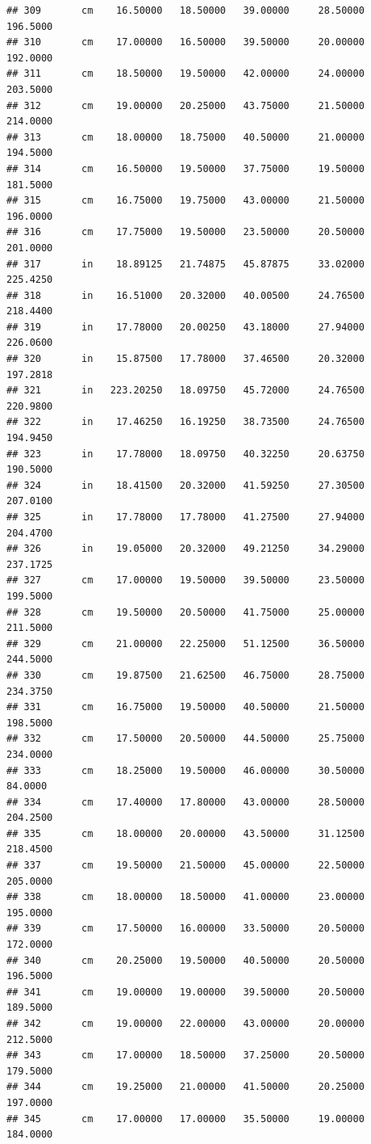 \documentclass[]{article}
\begin{document}
\begin{verbatim}
## 309       cm    16.50000   18.50000   39.00000     28.50000  196.5000
## 310       cm    17.00000   16.50000   39.50000     20.00000  192.0000
## 311       cm    18.50000   19.50000   42.00000     24.00000  203.5000
## 312       cm    19.00000   20.25000   43.75000     21.50000  214.0000
## 313       cm    18.00000   18.75000   40.50000     21.00000  194.5000
## 314       cm    16.50000   19.50000   37.75000     19.50000  181.5000
## 315       cm    16.75000   19.75000   43.00000     21.50000  196.0000
## 316       cm    17.75000   19.50000   23.50000     20.50000  201.0000
## 317       in    18.89125   21.74875   45.87875     33.02000  225.4250
## 318       in    16.51000   20.32000   40.00500     24.76500  218.4400
## 319       in    17.78000   20.00250   43.18000     27.94000  226.0600
## 320       in    15.87500   17.78000   37.46500     20.32000  197.2818
## 321       in   223.20250   18.09750   45.72000     24.76500  220.9800
## 322       in    17.46250   16.19250   38.73500     24.76500  194.9450
## 323       in    17.78000   18.09750   40.32250     20.63750  190.5000
## 324       in    18.41500   20.32000   41.59250     27.30500  207.0100
## 325       in    17.78000   17.78000   41.27500     27.94000  204.4700
## 326       in    19.05000   20.32000   49.21250     34.29000  237.1725
## 327       cm    17.00000   19.50000   39.50000     23.50000  199.5000
## 328       cm    19.50000   20.50000   41.75000     25.00000  211.5000
## 329       cm    21.00000   22.25000   51.12500     36.50000  244.5000
## 330       cm    19.87500   21.62500   46.75000     28.75000  234.3750
## 331       cm    16.75000   19.50000   40.50000     21.50000  198.5000
## 332       cm    17.50000   20.50000   44.50000     25.75000  234.0000
## 333       cm    18.25000   19.50000   46.00000     30.50000   84.0000
## 334       cm    17.40000   17.80000   43.00000     28.50000  204.2500
## 335       cm    18.00000   20.00000   43.50000     31.12500  218.4500
## 337       cm    19.50000   21.50000   45.00000     22.50000  205.0000
## 338       cm    18.00000   18.50000   41.00000     23.00000  195.0000
## 339       cm    17.50000   16.00000   33.50000     20.50000  172.0000
## 340       cm    20.25000   19.50000   40.50000     20.50000  196.5000
## 341       cm    19.00000   19.00000   39.50000     20.50000  189.5000
## 342       cm    19.00000   22.00000   43.00000     20.00000  212.5000
## 343       cm    17.00000   18.50000   37.25000     20.50000  179.5000
## 344       cm    19.25000   21.00000   41.50000     20.25000  197.0000
## 345       cm    17.00000   17.00000   35.50000     19.00000  184.0000

\end{verbatim}
\end{document}
